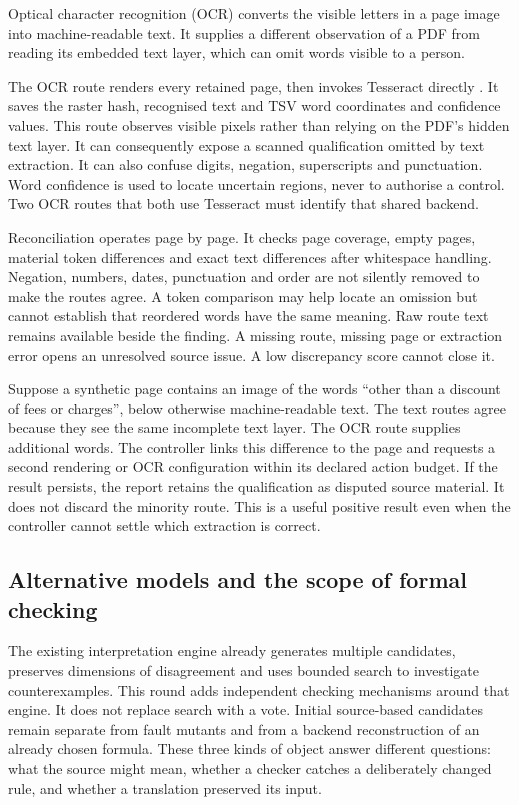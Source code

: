 \documentclass[12pt,a4paper,oneside,openany]{book}
\begin{document}
Optical character recognition (OCR) converts the visible letters in a page image
into machine-readable text. It supplies a different observation of a PDF from
reading its embedded text layer, which can omit words visible to a person.

The OCR route renders every retained page, then invokes Tesseract directly
\citep{tesseractsoftware}. It saves the raster hash, recognised text and TSV word
coordinates and confidence values. This route observes visible pixels rather
than relying on the PDF's hidden text layer. It can consequently expose a scanned
qualification omitted by text extraction. It can also confuse digits, negation,
superscripts and punctuation. Word confidence is used to locate uncertain
regions, never to authorise a control. Two OCR routes that both use Tesseract
must identify that shared backend.

Reconciliation operates page by page. It checks page coverage, empty pages,
material token differences and exact text differences after whitespace handling.
Negation, numbers, dates, punctuation and order are not silently removed to make
the routes agree. A token comparison may help locate an omission but cannot
establish that reordered words have the same meaning. Raw route text remains
available beside the finding. A missing route, missing page or extraction error
opens an unresolved source issue. A low discrepancy score cannot close it.

Suppose a synthetic page contains an image of the words ``other than a discount
of fees or charges'', below otherwise machine-readable text. The text routes
agree because they see the same incomplete text layer. The OCR route supplies
additional words. The controller links this difference to the page and requests
a second rendering or OCR configuration within its declared action budget. If
the result persists, the report retains the qualification as disputed source
material. It does not discard the minority route. This is a useful positive
result even when the controller cannot settle which extraction is correct.

\subsection{Alternative models and the scope of formal checking}

The existing interpretation engine already generates multiple candidates,
preserves dimensions of disagreement and uses bounded search to investigate
counterexamples. This round adds independent checking mechanisms around that
engine. It does not replace search with a vote. Initial source-based candidates
remain separate from fault mutants and from a backend reconstruction of an
already chosen formula. These three kinds of object answer different questions:
what the source might mean, whether a checker catches a deliberately changed
rule, and whether a translation preserved its input.
\end{document}
